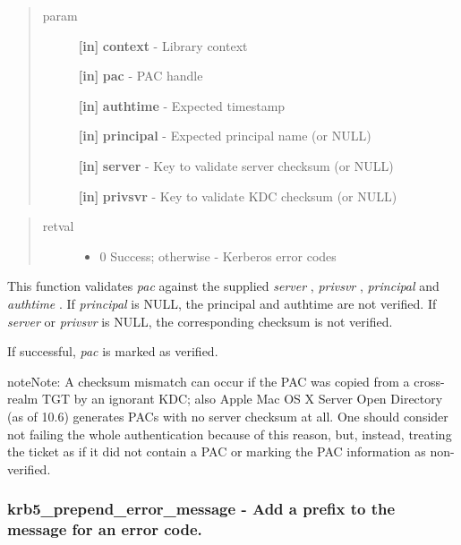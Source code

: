 \documentclass[letterpaper,10pt,english]{sphinxmanual}
\begin{document}
\begin{quote}\begin{description}
\item[{param}] \leavevmode
\textbf{{[}in{]}} \textbf{context} - Library context

\textbf{{[}in{]}} \textbf{pac} - PAC handle

\textbf{{[}in{]}} \textbf{authtime} - Expected timestamp

\textbf{{[}in{]}} \textbf{principal} - Expected principal name (or NULL)

\textbf{{[}in{]}} \textbf{server} - Key to validate server checksum (or NULL)

\textbf{{[}in{]}} \textbf{privsvr} - Key to validate KDC checksum (or NULL)

\end{description}\end{quote}
\begin{quote}\begin{description}
\item[{retval}] \leavevmode\begin{itemize}
\item {} 
0   Success; otherwise - Kerberos error codes

\end{itemize}

\end{description}\end{quote}

This function validates \emph{pac} against the supplied \emph{server} , \emph{privsvr} , \emph{principal} and \emph{authtime} . If \emph{principal} is NULL, the principal and authtime are not verified. If \emph{server} or \emph{privsvr} is NULL, the corresponding checksum is not verified.

If successful, \emph{pac} is marked as verified.

\begin{notice}{note}{Note:}
A checksum mismatch can occur if the PAC was copied from a cross-realm TGT by an ignorant KDC; also Apple Mac OS X Server Open Directory (as of 10.6) generates PACs with no server checksum at all. One should consider not failing the whole authentication because of this reason, but, instead, treating the ticket as if it did not contain a PAC or marking the PAC information as non-verified.
\end{notice}


\subsubsection{krb5\_prepend\_error\_message -  Add a prefix to the message for an error code.}
\label{appdev/refs/api/krb5_prepend_error_message:krb5-prepend-error-message-add-a-prefix-to-the-message-for-an-error-code}\label{appdev/refs/api/krb5_prepend_error_message::doc}
\end{document}
